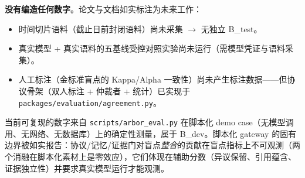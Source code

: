 \textbf{没有编造任何数字}。论文与文档如实标注为未来工作：

\begin{itemize}
\item 时间切片语料（截止日前封闭语料）尚未采集 $\rightarrow$ 无独立 B\_test。
\item 真实模型 + 真实语料的五基线受控对照实验尚未运行（需模型凭证与语料采集）。
\item 人工标注（金标准盲点的 Kappa/Alpha 一致性）尚未产生标注数据——但协议骨架（双人标注 + 仲裁者 + 统计）已实现于 \texttt{packages/evaluation/agreement.py}。
\end{itemize}

当前可复现的数字来自 \texttt{scripts/arbor\_eval.py} 在脚本化 demo case（无模型调用、无网络、无数据库）上的确定性测量，属于 B\_dev。脚本化 gateway 的固有边界被如实报告：协议/记忆/证据门对盲点\emph{整合}的贡献在盲点指标上不可观测（两个消融在脚本化素材上是零效应），它们体现在辅助分数（异议保留、引用蕴含、证据独立性）并要求真实模型运行才能观测。

